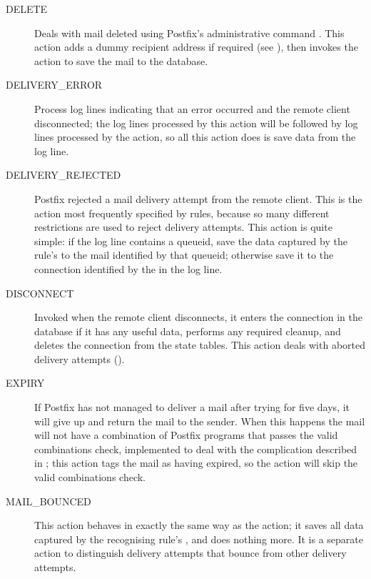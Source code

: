 \begin{description}
    \item [DELETE] Deals with mail deleted using Postfix's administrative
        command .  This action adds a dummy recipient
        address if required (see ), then invokes the  action to save the
        mail to the database.

    \item [DELIVERY\_ERROR] Process log lines indicating that an error
        occurred and the remote client disconnected; the log lines
        processed by this action will be followed by log lines processed by
        the  action, so all this action does is save
        data from the log line.

    \item [DELIVERY\_REJECTED] Postfix rejected a mail delivery attempt
        from the remote client.  This is the action most frequently
        specified by rules, because so many different restrictions are used
        to reject delivery attempts.  This action is quite simple: if the
        log line contains a queueid, save the data captured by the rule's
         to the mail identified by that queueid; otherwise
        save it to the connection identified by the  in the
        log line.

    \item [DISCONNECT] Invoked when the remote client disconnects, it
        enters the connection in the database if it has any useful data,
        performs any required cleanup, and deletes the connection from the
        state tables.  This action deals with aborted delivery attempts
        ().

    \item [EXPIRY] If Postfix has not managed to deliver a mail after
        trying for five days, it will give up and return the mail to the
        sender.  When this happens the mail will not have a combination of
        Postfix programs that passes the valid combinations check,
        implemented to deal with the complication described in
        ; this action tags the mail as
        having expired, so the  action will skip the valid
        combinations check.

    \item [MAIL\_BOUNCED] This action behaves in exactly the same way as
        the  action; it saves all data captured by the
        recognising rule's , and does nothing more.  It is a
        separate action to distinguish delivery attempts that bounce from
        other delivery attempts.


\end{description}
